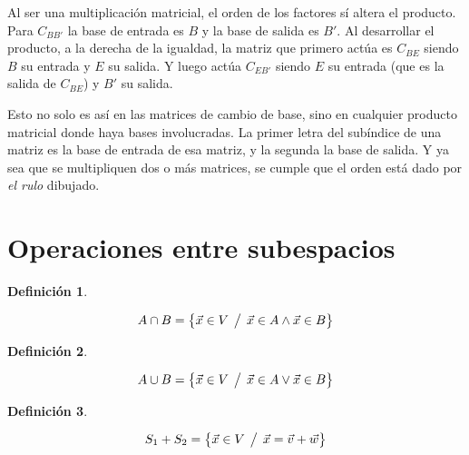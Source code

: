\documentclass[a5paper,12pt,twoside]{book}
\newtheorem{defn}{{Definición}}[chapter]
\begin{document}
Al ser una multiplicación matricial, el orden de los factores sí altera el producto.
Para $C_{BB'}$ la base de entrada es $B$ y la base de salida es $B'$.
Al desarrollar el producto, a la derecha de la igualdad, la matriz que primero actúa es $C_{BE}$ siendo $B$ su entrada y $E$ su salida.
Y luego actúa $C_{EB'}$ siendo $E$ su entrada (que es la salida de $C_{BE}$) y $B'$ su salida.

\begin{center}
    \def\svgwidth{0.4\linewidth}
    
\end{center}

Esto no solo es así en las matrices de cambio de base, sino en cualquier producto matricial donde haya bases involucradas.
La primer letra del subíndice de una matriz es la base de entrada de esa matriz, y la segunda la base de salida.
Y ya sea que se multipliquen dos o más matrices, se cumple que el orden está dado por \emph{el rulo} dibujado.


\section{Operaciones entre subespacios}

\begin{mdframed}[style=DefinitionFrame]
    \begin{defn}
    \end{defn}
    \begin{equation*}
        A \cap B = { \left\{ {\Vec{x} \in V \hspace{1ex} \big/ \hspace{1ex} \Vec{x}\in A \land \Vec{x}\in B} \right\} }
    \end{equation*}
\end{mdframed}

\begin{mdframed}[style=DefinitionFrame]
    \begin{defn}
    \end{defn}
    \begin{equation*}
        A \cup B = { \left\{ {\Vec{x} \in V \hspace{1ex} \big/ \hspace{1ex} \Vec{x}\in A \lor \Vec{x}\in B} \right\} }
    \end{equation*}
\end{mdframed}

\begin{mdframed}[style=DefinitionFrame]
    \begin{defn}
    \end{defn}
    \begin{equation*}
        S_1 + S_2 = { \left\{ {\Vec{x} \in V \hspace{1ex} \big/ \hspace{1ex} \Vec{x}=\Vec{v}+\Vec{w}} \right\} }
    \end{equation*}
\end{mdframed}
\end{document}
